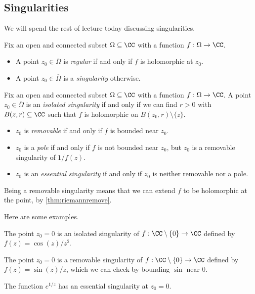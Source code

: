 \subsection{Singularities}
We will spend the rest of lecture today discussing singularities.
\begin{definition}
	Fix an open and connected subset $\Omega\subseteq\CC$ with a function $f:\Omega\to\CC$.
	\begin{itemize}
		\item A point $z_0\in\overline\Omega$ is \textit{regular} if and only if $f$ is holomorphic at $z_0$.
		\item A point $z_0\in\overline\Omega$ is a \textit{singularity} otherwise.
	\end{itemize}
\end{definition}
\begin{definition}
	Fix an open and connected subset $\Omega\subseteq\CC$ with a function $f:\Omega\to\CC$. A point $z_0\in\overline\Omega$ is an \textit{isolated singularity} if and only if we can find $r>0$ with $B(z,r)\subseteq\CC$ such that $f$ is holomorphic on $B(z_0,r)\setminus\{z\}$.
	\begin{itemize}
		\item $z_0$ is \textit{removable} if and only if $f$ is bounded near $z_0$.
		\item $z_0$ is a \textit{pole} if and only if $f$ is not bounded near $z_0$, but $z_0$ is a removable singularity of $1/f(z)$.
		\item $z_0$ is an \textit{essential singularity} if and only if $z_0$ is neither removable nor a pole.
	\end{itemize}
\end{definition}
\begin{remark}
	Being a removable singularity means that we can extend $f$ to be holomorphic at the point, by \autoref{thm:riemannremove}.
\end{remark}
Here are some examples.
\begin{example}
	The point $z_0=0$ is an isolated singularity of $f:\CC\setminus\{0\}\to\CC$ defined by $f(z)=\cos(z)/z^2$.
\end{example}
\begin{example}
	The point $z_0=0$ is a removable singularity of $f:\CC\setminus\{0\}\to\CC$ defined by $f(z)=\sin(z)/z$, which we can check by bounding $\sin$ near $0$.
\end{example}
\begin{example}
	The function $e^{1/z}$ has an essential singularity at $z_0=0$.
\end{example}
